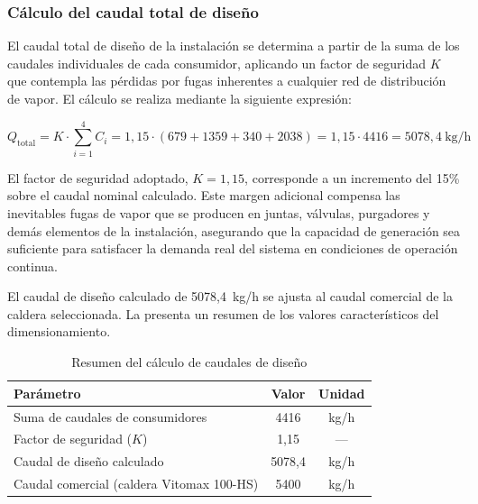 \documentclass[12pt]{article}
\begin{document}
\subsubsection{Cálculo del caudal total de diseño}

El caudal total de diseño de la instalación se determina a partir de la suma de los caudales individuales de cada consumidor, aplicando un factor de seguridad $K$ que contempla las pérdidas por fugas inherentes a cualquier red de distribución de vapor. El cálculo se realiza mediante la siguiente expresión:

\begin{equation}
	Q_{\text{total}} = K \cdot \sum_{i=1}^{4} C_i = 1{,}15 \cdot (679 + 1359 + 340 + 2038) = 1{,}15 \cdot 4416 = 5078{,}4 \ \text{kg/h}
	\label{eq:caudal-total-diseno}
\end{equation}

El factor de seguridad adoptado, $K = 1{,}15$, corresponde a un incremento del 15\% sobre el caudal nominal calculado. Este margen adicional compensa las inevitables fugas de vapor que se producen en juntas, válvulas, purgadores y demás elementos de la instalación, asegurando que la capacidad de generación sea suficiente para satisfacer la demanda real del sistema en condiciones de operación continua.

El caudal de diseño calculado de 5078,4~kg/h se ajusta al caudal comercial de la caldera seleccionada. La  presenta un resumen de los valores característicos del dimensionamiento.

\begin{table}[H]
	\centering
	\caption{Resumen del cálculo de caudales de diseño}
	\label{tab:resumen-caudales}
	\begin{tabular}{lcc}
		\toprule
		\textbf{Parámetro}                        & \textbf{Valor} & \textbf{Unidad} \\
		\midrule
		Suma de caudales de consumidores          & 4416           & kg/h            \\
		Factor de seguridad ($K$)                 & 1,15           & ---             \\
		Caudal de diseño calculado                & 5078,4         & kg/h            \\
		Caudal comercial (caldera Vitomax 100-HS) & 5400           & kg/h            \\
		\bottomrule
	\end{tabular}
\end{table}
\end{document}
